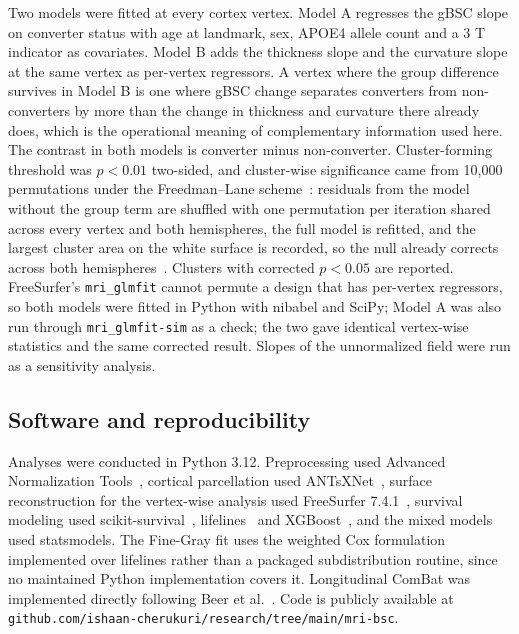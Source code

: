 \documentclass[blue]{ludusofficial}  %
\begin{document}
Two models were fitted at every cortex vertex. Model A regresses the gBSC slope on converter status with age at landmark, sex, APOE4 allele count and a 3 T indicator as covariates. Model B adds the thickness slope and the curvature slope at the same vertex as per-vertex regressors. A vertex where the group difference survives in Model B is one where gBSC change separates converters from non-converters by more than the change in thickness and curvature there already does, which is the operational meaning of complementary information used here. The contrast in both models is converter minus non-converter. Cluster-forming threshold was $p < 0.01$ two-sided, and cluster-wise significance came from 10,000 permutations under the Freedman--Lane scheme~\cite{freedman1983nonstochastic,winkler2014permutation}: residuals from the model without the group term are shuffled with one permutation per iteration shared across every vertex and both hemispheres, the full model is refitted, and the largest cluster area on the white surface is recorded, so the null already corrects across both hemispheres~\cite{hagler2006smoothing}. Clusters with corrected $p < 0.05$ are reported. FreeSurfer's \texttt{mri\_glmfit} cannot permute a design that has per-vertex regressors, so both models were fitted in Python with nibabel and SciPy; Model A was also run through \texttt{mri\_glmfit-sim} as a check; the two gave identical vertex-wise statistics and the same corrected result. Slopes of the unnormalized field were run as a sensitivity analysis.

\subsection{Software and reproducibility}

Analyses were conducted in Python 3.12. Preprocessing used Advanced Normalization Tools~\cite{avants2011ants}, cortical parcellation used ANTsXNet~\cite{tustison2021antsxnet}, surface reconstruction for the vertex-wise analysis used FreeSurfer 7.4.1~\cite{fischl2012freesurfer}, survival modeling used scikit-survival~\cite{polsterl2020sksurv}, lifelines~\cite{davidson-pilon2019lifelines} and XGBoost~\cite{chen2016xgboost}, and the mixed models used statsmodels. The Fine-Gray fit uses the weighted Cox formulation implemented over lifelines rather than a packaged subdistribution routine, since no maintained Python implementation covers it. Longitudinal ComBat was implemented directly following Beer et al.~\cite{beer2020longitudinal}. Code is publicly available at \texttt{github.com/ishaan-cherukuri/research/tree/main/mri-bsc}.
\end{document}
